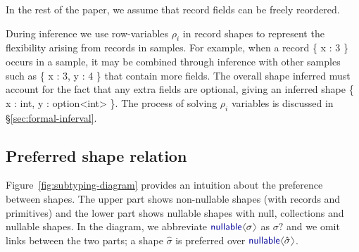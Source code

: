 \documentclass[10pt,preprint,blind,clearpagebib]{sigplanconf}
\newcommand{\langl}{\begin{picture}(4.5,7)
\put(1.1,2.5){\rotatebox{60}{\line(1,0){5.5}}}
\put(1.1,2.5){\rotatebox{300}{\line(1,0){5.5}}}
\end{picture}}
\newcommand{\rangl}{\begin{picture}(4.5,7)
\put(.9,2.5){\rotatebox{120}{\line(1,0){5.5}}}
\put(.9,2.5){\rotatebox{240}{\line(1,0){5.5}}}
\end{picture}}
\newcommand{\kvd}[1]{\textnormal{\textcolor{kvdclr}{\sffamily #1}}}
\begin{document}
In the rest of the paper, we assume that record fields can be freely reordered.

During inference we use row-variables $\rho_i$ in record shapes to represent the flexibility
arising from records in samples. For example, when a 
record {\small\ttfamily \{ x : 3 \}} occurs in a sample,
it may be combined through inference with other
samples such as {\small\ttfamily \{ x : 3, y : 4 \}} that contain more fields. The
overall shape inferred must account for the fact that any extra fields are optional,
giving an inferred shape {\small\ttfamily \{ x : int, y : option<int> \}}.
The process of solving $\rho_i$ variables is  discussed in \S\ref{sec:formal-inferval}. 



\subsection{Preferred shape relation}
\label{sec:inference-subtyping}

Figure~\ref{fig:subtyping-diagram} provides an intuition about the preference between 
shapes. The upper part shows non-nullable shapes (with records and primitives) and the lower part 
shows nullable shapes with \kvd{null}, collections and nullable shapes. In the diagram, we 
abbreviate $\kvd{nullable}\langl\sigma\rangl$ as $\sigma?$ and we omit links between the two parts;
a shape $\hat{\sigma}$ is preferred over $\kvd{nullable}\langl\hat{\sigma}\rangl$.
\end{document}
